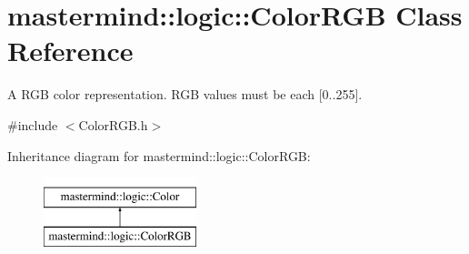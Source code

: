 \hypertarget{classmastermind_1_1logic_1_1_color_r_g_b}{}\section{mastermind\+:\+:logic\+:\+:Color\+R\+GB Class Reference}
\label{classmastermind_1_1logic_1_1_color_r_g_b}


A R\+GB color representation. R\+GB values must be each \mbox{[}0..255\mbox{]}.  




{\ttfamily \#include $<$Color\+R\+G\+B.\+h$>$}

Inheritance diagram for mastermind\+:\+:logic\+:\+:Color\+R\+GB\+:\begin{figure}[H]
\begin{center}
\leavevmode
\includegraphics[height=2.000000cm]{classmastermind_1_1logic_1_1_color_r_g_b}
\end{center}
\end{figure}
